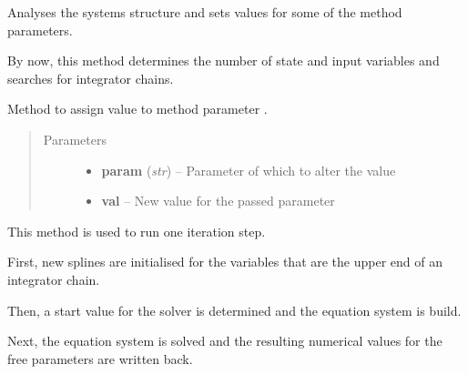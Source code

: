 \documentclass[letterpaper,10pt,english]{sphinxmanual}
\begin{document}
\begin{fulllineitems}

\begin{fulllineitems}
\label{pytrajectory:pytrajectory.trajectory.Trajectory.analyseSystem}
Analyses the systems structure and sets values for some of the method
parameters.

By now, this method determines the number of state and input variables
and searches for integrator chains.

\end{fulllineitems}


\begin{fulllineitems}
\label{pytrajectory:pytrajectory.trajectory.Trajectory.setParam}
Method to assign value  to method parameter .
\begin{quote}\begin{description}
\item[{Parameters}] \leavevmode\begin{itemize}
\item {} 
\textbf{param} (\emph{str}) -- Parameter of which to alter the value

\item {} 
\textbf{val} -- New value for the passed parameter

\end{itemize}

\end{description}\end{quote}

\end{fulllineitems}


\begin{fulllineitems}
\label{pytrajectory:pytrajectory.trajectory.Trajectory.iterate}
This method is used to run one iteration step.

First, new splines are initialised for the variables that are the upper
end of an integrator chain.

Then, a start value for the solver is determined and the equation
system is build.

Next, the equation system is solved and the resulting numerical values
for the free parameters are written back.


\end{fulllineitems}
\end{fulllineitems}
\end{document}
